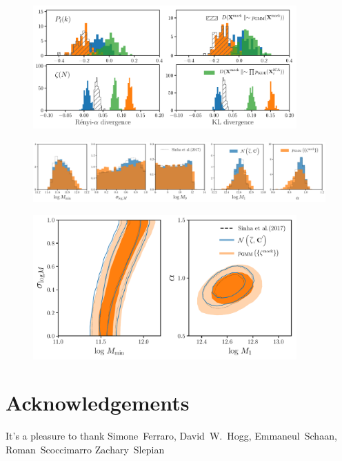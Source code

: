 \documentclass[12pt, letterpaper, preprint]{aastex}
\begin{document}
\begin{figure}
\begin{center}
\includegraphics[width=0.9\textwidth]{figs/kNNdiverg_nonGauss.pdf}
\caption{}
\label{fig:div_nongauss}
\end{center}
\end{figure}

\begin{figure}
\begin{center}
\includegraphics[width=\textwidth]{figs/Like_GMF_comparison.pdf}
\caption{}
\label{fig:gmf_like}
\end{center}
\end{figure}

\begin{figure}
\begin{center}
\includegraphics[width=0.9\textwidth]{figs/GMFcontours_manodeep.pdf}
\caption{}
\label{fig:gmf_contour}
\end{center}
\end{figure}

\section*{Acknowledgements}
It's a pleasure to thank 
    Simone~Ferraro,
    David~W.~Hogg,
    Emmaneul~Schaan, 
    Roman~Scoccimarro
    Zachary~Slepian



\end{document}
